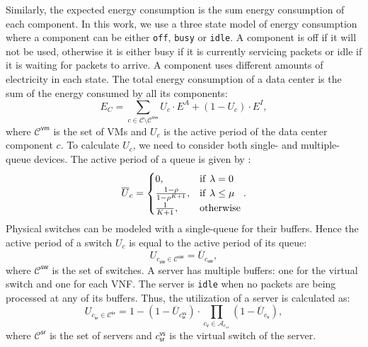 Similarly, the expected energy consumption is the sum energy consumption of each component. In this work, we use a three state model of energy consumption where a component can be either \texttt{off}, \texttt{busy} or \texttt{idle}. A component is off if it will not be used, otherwise it is either busy if it is currently servicing packets or idle if it is waiting for packets to arrive. A component uses different amounts of electricity in each state. The total energy consumption of a data center is the sum of the energy consumed by all its components:
\begin{equation}
	E_C=\sum_{c\in\mathcal{C}\setminus\mathcal{C}^{\mathsf{vm}}} U_c\cdot E^A+(1-U_c)\cdot E^I,
	\label{eq:energy}
\end{equation}
where $\mathcal{C}^{\mathsf{vm}}$ is the set of VMs and $U_c$ is the active period of the data center component $c$. To calculate $U_c$, we need to consider both single- and multiple-queue devices. The active period of a queue is given by \cite{Kleinrock75}:
\begin{equation}
	\overline{U}_c =
	\begin{cases}
		0,                           & \rm{if} \ \lambda=0    \\
		\frac{1-\rho}{1-\rho^{K+1}}, & \rm{if}\ \lambda\le\mu \\
		\frac{1}{K+1},               & { \rm{otherwise} }
	\end{cases}.
\end{equation}
Physical switches can be modeled with a single-queue for their buffers. Hence the active period of a switch $U_c$ is equal to the active period of its queue:
\begin{equation}
	U_{c_\mathsf{sw} \in\mathcal{C}^{\mathsf{sw}}} = \overline{U}_{c_\mathsf{sw}},
\end{equation}
where $\mathcal{C}^{\mathsf{sw}}$ is the set of switches. A server has multiple buffers: one for the virtual switch and one for each VNF. The server is \texttt{idle} when no packets are being processed at any of its buffers. Thus, the utilization of a server is calculated as:
\begin{equation}
	U_{c_{\mathsf{sr}}\in\mathcal{C}^\mathsf{sr}}=1-\left(1-\overline{U}_{c_\mathsf{sr}^\mathsf{vs}} \right)\cdot\prod_{c_{\mathsf{v}}\in\mathcal{A}_{c_{sr}}}\left(1-\overline{U}_{c_{\mathsf{v}}} \right),
\end{equation}
where $\mathcal{C}^\mathsf{sr}$ is the set of servers and $c_\mathsf{sr}^\mathsf{vs}$ is the virtual switch of the server.

